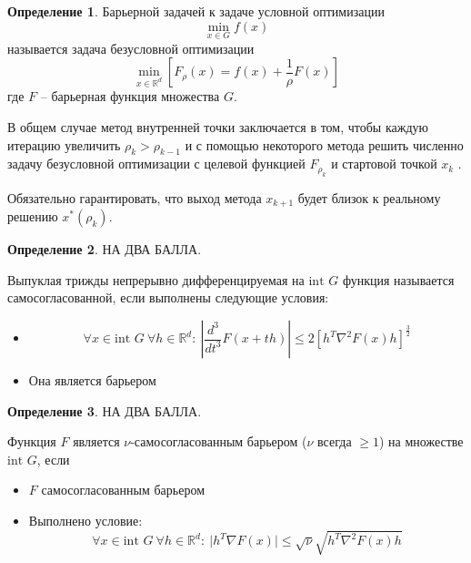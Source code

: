 \documentclass[a4paper,12pt]{article}
\renewcommand{\leq}{\ensuremath{\leqslant}}
\renewcommand{\geq}{\ensuremath{\geqslant}}
\theoremstyle{plain}
\theoremstyle{definition}
\newtheorem{definition}{Определение}[section]
\theoremstyle{remark}
\begin{document}
\begin{definition}
  Барьерной задачей к задаче условной оптимизации
  \[
    \min_{x \in G} f(x)
  \]
  называется задача безусловной оптимизации
  \[
    \min_{x \in \mathbb{R}^d}\left[F_\rho(x) = f(x) + \frac{1}{\rho}F(x)\right]
  \]
  где $F$ -- барьерная функция множества $G$.
\end{definition}

В общем случае метод внутренней точки заключается в том, чтобы каждую итерацию увеличить $\rho_k > \rho_{k - 1}$ и с помощью некоторого метода решить численно задачу безусловной оптимизации с целевой функцией $F_{\rho_k}$ и стартовой точкой $x_k$
. 

Обязательно гарантировать, что выход метода $x_{k + 1}$ будет близок к реальному решению $x^*(\rho_k)$.

\begin{definition}
  НА ДВА БАЛЛА.

  Выпуклая трижды непрерывно дифференцируемая на $\text{int }G$ функция называется самосогласованной, если выполнены следующие условия:
  \begin{itemize}
    \item 
    \[
      \forall x \in \text{int }G \: \forall h \in \mathbb{R}^d :\: \left\vert\frac{d^3}{dt^3}F(x + th)\right\vert \leq 2[h^T\nabla^2F(x)h]^{\frac{3}{2}}
    \]
    \item Она является барьером
  \end{itemize}
\end{definition}

\begin{definition}
  НА ДВА БАЛЛА.

  Функция $F$ является $\nu$-самосогласованным барьером ($\nu$ всегда $\geq 1$) на множестве $\text{int }G$, если
  \begin{itemize}
    \item $F$ самосогласованным барьером
    \item Выполнено условие:
    \[
      \forall x \in \text{int }G \: \forall h \in \mathbb{R}^d :\: \vert h^T \nabla F(x)\vert \leq \sqrt{\nu}\sqrt{h^T \nabla^2 F(x)h}
    \]
  \end{itemize}
\end{definition}
\end{document}
